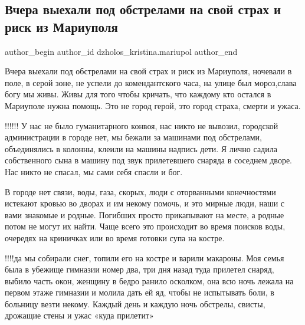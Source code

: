  
 
 
 
 

\subsection{Вчера выехали под обстрелами на свой страх и риск из Мариуполя}
\label{sec:17_03_2022.fb.dzholos_kristina.mariupol.1.vchera_viekhali_pod_}

\ifcmt
 author_begin
   author_id dzholos_kristina.mariupol
 author_end
\fi

Вчера выехали под обстрелами на свой страх и риск из Мариуполя, ночевали в
поле, в серой зоне, не успели до комендантского часа, на улице был мороз,слава
богу мы живы. Живы для того чтобы кричать, что каждому кто остался в Мариуполе
нужна помощь. Это не город герой, это город страха, смерти и ужаса.

!!!!!! У нас не было гуманитарного конвоя, нас никто не вывозил, городской
администрации в городе нет, мы бежали за машинами под обстрелами, объединялись
в колонны, клеили на машины надпись дети. Я лично садила собственного сына в
машину под звук прилетевшего снаряда в соседнем дворе. Нас никто не спасал, мы
сами себя спасли и бог. 

В городе нет связи, воды, газа, скорых, люди с оторванными конечностями
истекают кровью во дворах и им некому помочь, и это мирные люди, наши с вами
знакомые и родные. Погибших просто прикапывают на месте, а родные потом не
могут их найти. Чаще всего это происходит во время поисков воды, очередях на
криничках или во время готовки супа на костре. 

!!!!да мы собирали снег, топили его на костре и варили макароны. Моя семья была
в убежище гимназии номер два, три дня назад туда прилетел снаряд, выбило часть
окон, женщину в бедро ранило осколком, она всю ночь лежала на первом этаже
гимназии и молила дать ей яд, чтобы не испытывать боли, в больницу везти
некому. Каждый день и каждую ночь обстрелы, свисты, дрожащие стены и ужас «куда
прилетит»

